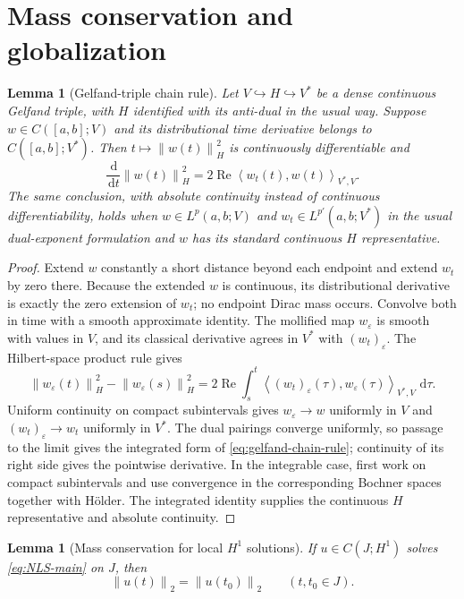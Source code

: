 \documentclass[11pt,oneside]{book}
\newtheorem{lemma}[theorem]{Lemma}
\theoremstyle{definition}
\theoremstyle{remark}
\newcommand{\1}{\mathbf 1}
\newcommand{\Rea}{\operatorname{Re}}
\newcommand{\dd}{\,\mathrm d}
\newcommand{\norm}[1]{\left\lVert #1\right\rVert}
\newcommand{\pair}[2]{\left\langle #1,#2\right\rangle}
\newcommand{\eps}{\varepsilon}
\begin{document}
\section{Mass conservation and globalization}

\begin{lemma}[Gelfand-triple chain rule]\label{lem:gelfand-chain-rule}
Let $V\hookrightarrow H\hookrightarrow V^*$ be a dense continuous Gelfand
triple, with $H$ identified with its anti-dual in the usual way.  Suppose
$w\in C([a,b];V)$ and its distributional time derivative belongs to
$C([a,b];V^*)$.  Then $t\mapsto\norm{w(t)}_H^2$ is continuously
differentiable and
\begin{equation}
 \frac{\dd}{\dd t}\norm{w(t)}_H^2
 =2\Rea\pair{w_t(t)}{w(t)}_{V^*,V}.                \label{eq:gelfand-chain-rule}
\end{equation}
The same conclusion, with absolute continuity instead of continuous
differentiability, holds when $w\in L^p(a,b;V)$ and
$w_t\in L^{p'}(a,b;V^*)$ in the usual dual-exponent formulation and $w$
has its standard continuous $H$ representative.
\end{lemma}

\begin{proof}
Extend $w$ constantly a short distance beyond each endpoint and extend
$w_t$ by zero there.  Because the extended $w$ is continuous, its
distributional derivative is exactly the zero extension of $w_t$; no endpoint
Dirac mass occurs.  Convolve both in time with a smooth approximate identity.
The mollified map $w_\eps$ is smooth with values in $V$, and its classical
derivative agrees in $V^*$ with $(w_t)_\eps$.  The Hilbert-space product rule
gives
\[
 \norm{w_\eps(t)}_H^2-\norm{w_\eps(s)}_H^2
 =2\Rea\int_s^t
   \pair{(w_t)_\eps(\tau)}{w_\eps(\tau)}_{V^*,V}\,\dd\tau.
\]
Uniform continuity on compact subintervals gives
$w_\eps\to w$ uniformly in $V$ and $(w_t)_\eps\to w_t$ uniformly in
$V^*$.  The dual pairings converge uniformly, so passage to the limit gives
the integrated form of \eqref{eq:gelfand-chain-rule}; continuity of its
right side gives the pointwise derivative.  In the integrable case, first
work on compact subintervals and use convergence in the corresponding
Bochner spaces together with H\"older.  The integrated identity supplies the
continuous $H$ representative and absolute continuity.
\end{proof}

\begin{lemma}[Mass conservation for local $H^1$ solutions]\label{lem:mass-H1}
If $u\in C(J;H^1)$ solves \eqref{eq:NLS-main} on $J$, then
\[
  \norm{u(t)}_2=\norm{u(t_0)}_2\qquad(t,t_0\in J).
\]
\end{lemma}
\end{document}
